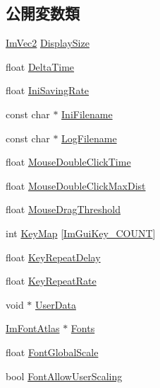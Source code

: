 \subsection*{公開変数類}
\begin{DoxyCompactItemize}
\item 
\mbox{\hyperlink{struct_im_vec2}{Im\+Vec2}} \mbox{\hyperlink{struct_im_gui_i_o_a042cfb90bdc9ccfe37f86b92ade759fd}{Display\+Size}}
\item 
float \mbox{\hyperlink{struct_im_gui_i_o_a5068d5414a19c2a1bf58029bd732a7c7}{Delta\+Time}}
\item 
float \mbox{\hyperlink{struct_im_gui_i_o_a9b37eea17baa240a93b1288673a6eeb9}{Ini\+Saving\+Rate}}
\item 
const char $\ast$ \mbox{\hyperlink{struct_im_gui_i_o_a89e8efe8f82b539c961dc22cc2499402}{Ini\+Filename}}
\item 
const char $\ast$ \mbox{\hyperlink{struct_im_gui_i_o_ae77a1beed11820366800645232a6ad1c}{Log\+Filename}}
\item 
float \mbox{\hyperlink{struct_im_gui_i_o_aee056f6ed15363e0bcd8d879b312da7c}{Mouse\+Double\+Click\+Time}}
\item 
float \mbox{\hyperlink{struct_im_gui_i_o_a13334c1522aadc12af0ce3b31b0eb3a1}{Mouse\+Double\+Click\+Max\+Dist}}
\item 
float \mbox{\hyperlink{struct_im_gui_i_o_ad8b9a9924b0d6bde6a0fa35c17aa54ae}{Mouse\+Drag\+Threshold}}
\item 
int \mbox{\hyperlink{struct_im_gui_i_o_aa1cd0083960f8e5361eb6d49973c8823}{Key\+Map}} \mbox{[}\mbox{\hyperlink{imgui_8h_a683cc5d09c63d74035a98ac3b0dec545aec3107a9dcdc5632cdcd57d4f8bbed18}{Im\+Gui\+Key\+\_\+\+C\+O\+U\+NT}}\mbox{]}
\item 
float \mbox{\hyperlink{struct_im_gui_i_o_a390537e7cba21b98a8f89df857ea59fb}{Key\+Repeat\+Delay}}
\item 
float \mbox{\hyperlink{struct_im_gui_i_o_accd71987c895c4aec6d1a8c368cc9e0e}{Key\+Repeat\+Rate}}
\item 
void $\ast$ \mbox{\hyperlink{struct_im_gui_i_o_a8c5e74fd39c2655455329e09529da7d3}{User\+Data}}
\item 
\mbox{\hyperlink{struct_im_font_atlas}{Im\+Font\+Atlas}} $\ast$ \mbox{\hyperlink{struct_im_gui_i_o_a24e4f5201fe8780267abc2acfc24254c}{Fonts}}
\item 
float \mbox{\hyperlink{struct_im_gui_i_o_a74a64a74dcbe2a6ef0c1ef56ba328094}{Font\+Global\+Scale}}
\item 
bool \mbox{\hyperlink{struct_im_gui_i_o_af5fc6eae7ce68cce8473f006431f530e}{Font\+Allow\+User\+Scaling}}

\end{DoxyCompactItemize}
